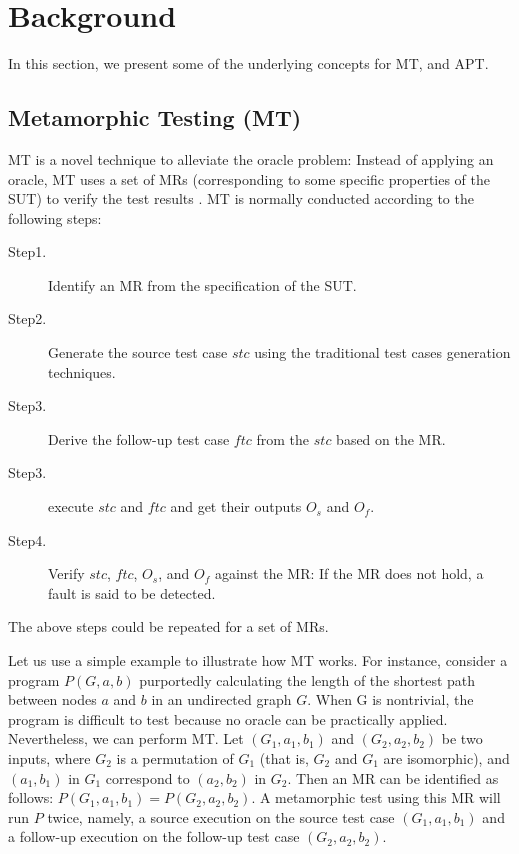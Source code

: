 \documentclass[10pt,journal,compsoc]{IEEEtran}
\begin{document}
\section{Background}
\label{sec:background}

In this section, we present some of the underlying concepts for MT, and APT.

\subsection{Metamorphic Testing (MT)}

\label{section:mt}

MT is a novel technique to alleviate the oracle problem: Instead of applying an oracle, MT uses a set of MRs (corresponding to some specific properties of the SUT) to verify the test results \cite{chen1998metamorphic}. MT is normally conducted according to the following steps:

\begin{description}
  \item [Step1.]
  Identify an MR from the specification of the SUT.
  \item [Step2.]
  Generate the source test case $stc$ using the traditional test cases generation techniques.
  \item [Step3.]
  Derive the follow-up test case $ftc$ from the $stc$ based on the MR.
  \item [Step3.]
  execute $stc$ and $ftc$ and get their outputs $O_s$ and $O_f$.
  \item [Step4.]
  Verify $stc$, $ftc$, $O_s$, and $O_f$ against the MR: If the MR does not hold, a fault is said to be detected.
\end{description}
The above steps could be repeated for a set of MRs.

Let us use a simple example to illustrate how MT works. For instance, consider a program $P(G, a, b)$ purportedly calculating the length of the shortest path between nodes $a$ and $b$ in an undirected graph $G$. When G is nontrivial, the program is difficult to test because no oracle can be practically applied. Nevertheless, we can perform MT. Let $(G_1, a_1, b_1)$ and $(G_2, a_2, b_2)$ be two inputs, where $G_2$ is a permutation of $G_1$ (that is, $G_2$ and $G_1$ are isomorphic), and $(a_1, b_1)$ in $G_1$ correspond to $(a_2, b_2)$ in $G_2$. Then an MR can be identified as follows: $P(G_1, a_1, b_1) = P(G_2, a_2, b_2)$. A metamorphic
test using this MR will run $P$ twice, namely, a source execution on the source test case $(G_1, a_1, b_1)$ and a follow-up execution on the follow-up test case $(G_2, a_2, b_2)$.
\end{document}
